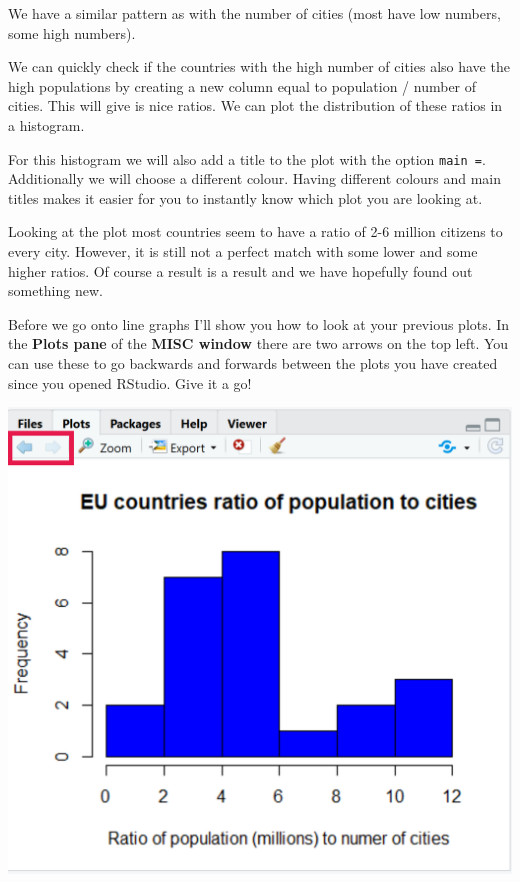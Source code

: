 \documentclass[]{book}
\newenvironment{Shaded}{\begin{snugshade}}{\end{snugshade}}
\newcommand{\KeywordTok}[1]{\textcolor[rgb]{0.13,0.29,0.53}{\textbf{#1}}}
\newcommand{\DataTypeTok}[1]{\textcolor[rgb]{0.13,0.29,0.53}{#1}}
\newcommand{\StringTok}[1]{\textcolor[rgb]{0.31,0.60,0.02}{#1}}
\newcommand{\CommentTok}[1]{\textcolor[rgb]{0.56,0.35,0.01}{\textit{#1}}}
\newcommand{\OperatorTok}[1]{\textcolor[rgb]{0.81,0.36,0.00}{\textbf{#1}}}
\newcommand{\NormalTok}[1]{#1}
\begin{document}
We have a similar pattern as with the number of cities (most have low
numbers, some high numbers).

We can quickly check if the countries with the high number of cities
also have the high populations by creating a new column equal to
population / number of cities. This will give is nice ratios. We can
plot the distribution of these ratios in a histogram.

For this histogram we will also add a title to the plot with the option
\texttt{main\ =}. Additionally we will choose a different colour. Having
different colours and main titles makes it easier for you to instantly
know which plot you are looking at.

\begin{Shaded}
\end{Shaded}

Looking at the plot most countries seem to have a ratio of 2-6 million
citizens to every city. However, it is still not a perfect match with
some lower and some higher ratios. Of course a result is a result and we
have hopefully found out something new.

Before we go onto line graphs I'll show you how to look at your previous
plots. In the \textbf{Plots pane} of the \textbf{MISC window} there are
two arrows on the top left. You can use these to go backwards and
forwards between the plots you have created since you opened RStudio.
Give it a go!

\begin{center}\includegraphics[width=0.4\linewidth]{figures/RStudio_plot_pane_arrows} \end{center}
\end{document}
